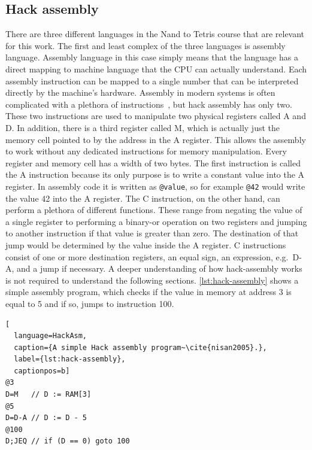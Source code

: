 \subsection{Hack assembly} \label{hack-assembly}
There are three different languages in the Nand to Tetris course that are relevant for this work.
The first and least complex of the three languages is assembly language.
Assembly language in this case simply means that the language has a direct mapping to machine language that the CPU can actually understand.
Each assembly instruction can be mapped to a single number that can be interpreted directly by the machine's hardware.
Assembly in modern systems is often complicated with a plethora of instructions~\cite{guide2011intel}, but hack assembly has only two.
These two instructions are used to manipulate two physical registers called A and D.
In addition, there is a third register called M, which is actually just the memory cell pointed to by the address in the A register.
This allows the assembly to work without any dedicated instructions for memory manipulation.
Every register and memory cell has a width of two bytes.
The first instruction is called the A instruction because its only purpose is to write a constant value into the A register.
In assembly code it is written as \verb+@value+, so for example \verb+@42+ would write the value 42 into the A register.
The C instruction, on the other hand, can perform a plethora of different functions.
These range from negating the value of a single register to performing a binary-or operation on two registers and jumping to another instruction if that value is greater than zero.
The destination of that jump would be determined by the value inside the A register.
C instructions consist of one or more destination registers, an equal sign, an expression, e.g.\ D-A, and a jump if necessary.
A deeper understanding of how hack-assembly works is not required to understand the following sections.
\cref{lst:hack-assembly} shows a simple assembly program, which checks if the value in memory at address 3 is equal to 5 and if so, jumps to instruction 100.

\begin{lstlisting}[
  language=HackAsm,
  caption={A simple Hack assembly program~\cite{nisan2005}.},
  label={lst:hack-assembly},
  captionpos=b]
@3
D=M   // D := RAM[3]
@5
D=D-A // D := D - 5
@100
D;JEQ // if (D == 0) goto 100
\end{lstlisting}

